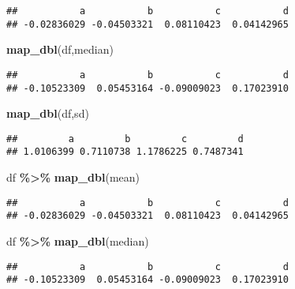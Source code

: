 \documentclass[
]{article}
\newenvironment{Shaded}{\begin{snugshade}}{\end{snugshade}}
\newcommand{\FunctionTok}[1]{\textcolor[rgb]{0.13,0.29,0.53}{\textbf{#1}}}
\newcommand{\NormalTok}[1]{#1}
\newcommand{\SpecialCharTok}[1]{\textcolor[rgb]{0.81,0.36,0.00}{\textbf{#1}}}
\begin{document}
\begin{verbatim}
##           a           b           c           d 
## -0.02836029 -0.04503321  0.08110423  0.04142965
\end{verbatim}

\begin{Shaded}
\begin{Highlighting}[]
\FunctionTok{map\_dbl}\NormalTok{(df,median)}
\end{Highlighting}
\end{Shaded}

\begin{verbatim}
##           a           b           c           d 
## -0.10523309  0.05453164 -0.09009023  0.17023910
\end{verbatim}

\begin{Shaded}
\begin{Highlighting}[]
\FunctionTok{map\_dbl}\NormalTok{(df,sd)}
\end{Highlighting}
\end{Shaded}

\begin{verbatim}
##         a         b         c         d 
## 1.0106399 0.7110738 1.1786225 0.7487341
\end{verbatim}

\begin{Shaded}
\begin{Highlighting}[]
\NormalTok{df }\SpecialCharTok{\%\textgreater{}\%} \FunctionTok{map\_dbl}\NormalTok{(mean)}
\end{Highlighting}
\end{Shaded}

\begin{verbatim}
##           a           b           c           d 
## -0.02836029 -0.04503321  0.08110423  0.04142965
\end{verbatim}

\begin{Shaded}
\begin{Highlighting}[]
\NormalTok{df }\SpecialCharTok{\%\textgreater{}\%} \FunctionTok{map\_dbl}\NormalTok{(median)}
\end{Highlighting}
\end{Shaded}

\begin{verbatim}
##           a           b           c           d 
## -0.10523309  0.05453164 -0.09009023  0.17023910
\end{verbatim}
\end{document}
